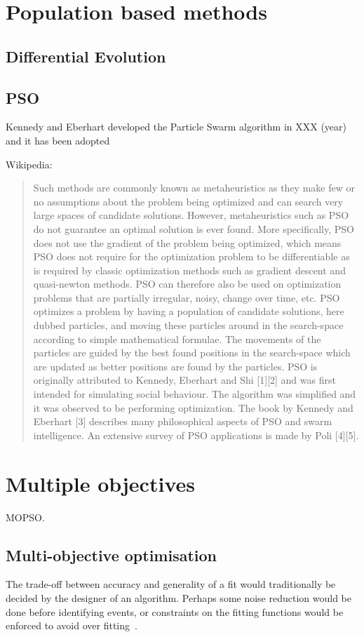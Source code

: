 \section{Population based methods}
\subsection{Differential Evolution}
\subsection{PSO}
Kennedy and Eberhart developed the Particle Swarm algorithm in XXX
(year) and it has been adopted

Wikipedia: 
\begin{quote}
  Such methods are commonly known as metaheuristics as they make few
  or no assumptions about the problem being optimized and can search
  very large spaces of candidate solutions. However, metaheuristics
  such as PSO do not guarantee an optimal solution is ever found.
  More specifically, PSO does not use the gradient of the problem
  being optimized, which means PSO does not require for the
  optimization problem to be differentiable as is required by classic
  optimization methods such as gradient descent and quasi-newton
  methods. PSO can therefore also be used on optimization problems
  that are partially irregular, noisy, change over time, etc.  PSO
  optimizes a problem by having a population of candidate solutions,
  here dubbed particles, and moving these particles around in the
  search-space according to simple mathematical formulae. The
  movements of the particles are guided by the best found positions in
  the search-space which are updated as better positions are found by
  the particles.  PSO is originally attributed to Kennedy, Eberhart
  and Shi [1][2] and was first intended for simulating social
  behaviour. The algorithm was simplified and it was observed to be
  performing optimization. The book by Kennedy and Eberhart [3]
  describes many philosophical aspects of PSO and swarm
  intelligence. An extensive survey of PSO applications is made by
  Poli [4][5].
\end{quote}

\section{Multiple objectives}
MOPSO.

\subsection{Multi-objective optimisation}
The trade-off between accuracy and generality of a fit would
traditionally be decided by the designer of an algorithm.  Perhaps
some noise reduction would be done before identifying events, or
constraints on the fitting functions would be enforced to avoid over
fitting~\citep{arora.khot2003fitting,punskaya.andrieu.ea2002bayesian}.  

